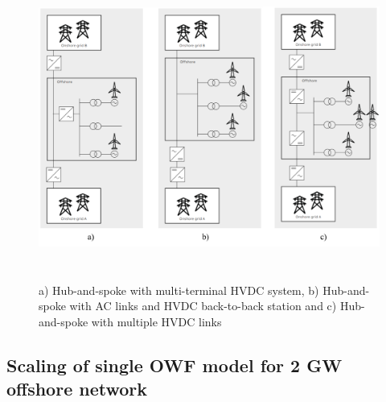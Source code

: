 \begin{figure}[H]
\centering
    \includegraphics[height = 10cm,width = 15cm]{Diagrams/Chapter_4/ABB_Hub_Spoke_3.png}
    \caption{a) Hub-and-spoke with multi-terminal HVDC system, b) Hub-and-spoke with AC links and HVDC back-to-back station and c) Hub-and-spoke with multiple HVDC links \cite{abb_hvdc_2018}}
    \label{fig:ABB_Hub_Spoke_3}
\end{figure}





\subsection{Scaling of single \gls{OWF} model for 2 GW offshore network}

